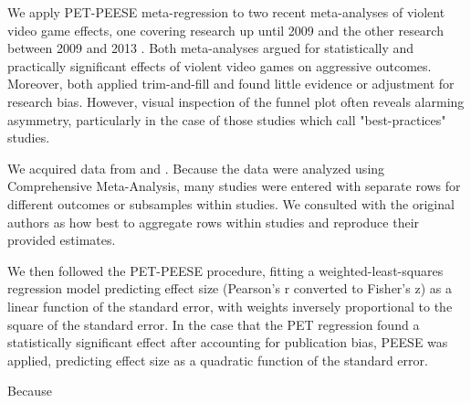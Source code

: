 We apply PET-PEESE meta-regression to two recent meta-analyses of violent video game effects, one covering research up until 2009 \citep{Anderson:etal:2010} and the other research between 2009 and 2013 \citep{Greitemeyer:Mugge:2014}. Both meta-analyses argued for statistically and practically significant effects of violent video games on aggressive outcomes. Moreover, both applied trim-and-fill and found little evidence or adjustment for research bias. However, visual inspection of the funnel plot often reveals alarming asymmetry, particularly in the case of those studies which \citet{Anderson:etal:2010} call "best-practices" studies.

We acquired data from \citet{Anderson:etal:2010} and \citet{Greitemeyer:Mugge:2014}. Because the data were analyzed using Comprehensive Meta-Analysis, many studies were entered with separate rows for different outcomes or subsamples within studies. We consulted with the original authors as how best to aggregate rows within studies and reproduce their provided estimates.

We then followed the PET-PEESE procedure, fitting a weighted-least-squares regression model predicting effect size (Pearson's r converted to Fisher's z) as a linear function of the standard error, with weights inversely proportional to the square of the standard error. In the case that the PET regression found a statistically significant effect after accounting for publication bias, PEESE was applied, predicting effect size as a quadratic function of the standard error. 

Because